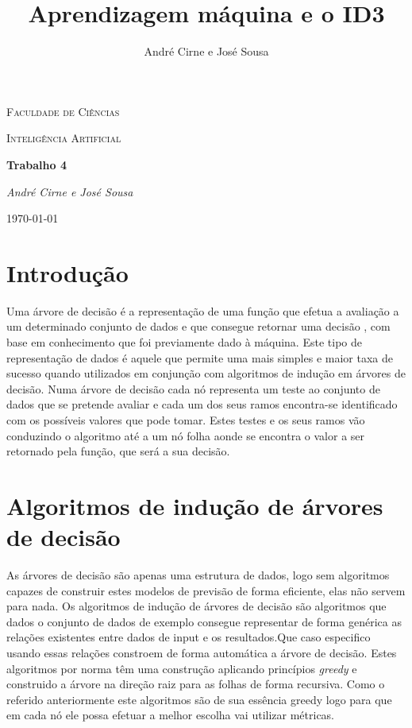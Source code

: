 \documentclass[12pt,a4paper]{article}
\author{André Cirne e José Sousa}
\title{Aprendizagem máquina e o ID3}
\begin{document}
	
\begin{titlepage}
	\centering
	{\scshape\LARGE Faculdade de Ciências \par}
	\vspace{1cm}
	{\scshape\Large Inteligência Artificial\par}
	\vspace{1.5cm}
	{\huge\bfseries Trabalho 4\par}
	\vspace{2cm}
	{\Large\itshape André Cirne e José Sousa\par}
	\vfill
	
	{\large \today\par}
\end{titlepage}

\tableofcontents
\section{Introdução}
Uma árvore de decisão é a representação de uma função que efetua a avaliação a um determinado conjunto de dados e que consegue retornar uma decisão \cite{stuart2016artificial}, com base em conhecimento que foi previamente dado à máquina. Este tipo de representação de dados é aquele que permite uma mais simples e maior taxa de sucesso quando utilizados em conjunção com algoritmos de indução em árvores de decisão.
Numa árvore de decisão cada nó representa um teste ao conjunto de dados que se pretende avaliar e cada um dos seus ramos encontra-se identificado com os possíveis valores que pode tomar. Estes testes e os seus ramos vão conduzindo o algoritmo até a um nó folha aonde se encontra o valor a ser retornado pela função, que será a sua decisão.

\section{Algoritmos de indução de árvores de decisão}
As árvores de decisão são apenas uma estrutura de dados, logo sem algoritmos capazes de construir estes modelos de previsão de forma eficiente, elas não servem para nada.
Os algoritmos de indução de árvores de decisão são algoritmos que dados o conjunto de dados de exemplo consegue representar de forma genérica as relações existentes entre dados de input e os resultados.Que caso especifico usando essas relações constroem de forma automática a árvore de decisão.\cite{rokach2005top} Estes algoritmos por norma têm uma construção aplicando princípios \textit{greedy} e construido a árvore na direção raiz para as folhas de forma recursiva.
Como o referido anteriormente este algoritmos são de sua essência greedy logo para que em cada nó ele possa efetuar a melhor escolha vai utilizar métricas.
\end{document}
